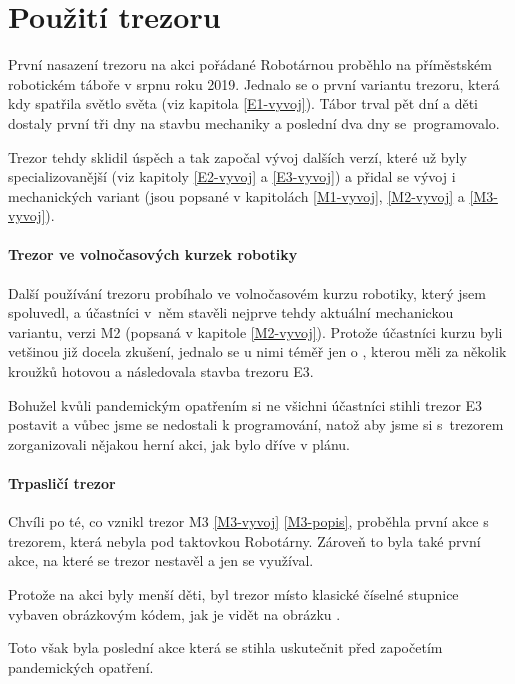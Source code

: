 \section{Použití trezoru}
První nasazení trezoru na akci pořádané Robotárnou \parencite{robotarna} proběhlo na příměstském robotickém táboře v srpnu roku 2019.
Jednalo se o první variantu trezoru, která kdy spatřila světlo světa (viz kapitola \ref{E1-vyvoj}). Tábor trval pět dní a děti dostaly první tři dny na stavbu mechaniky a poslední dva dny 
se~programovalo. 

Trezor tehdy sklidil úspěch a tak započal vývoj dalších verzí, které už byly specializovanější (viz kapitoly \ref{E2-vyvoj} a  \ref{E3-vyvoj}) a přidal se vývoj i mechanických
variant (jsou popsané v kapitolách \ref{M1-vyvoj}, \ref{M2-vyvoj} a \ref{M3-vyvoj}).

\paragraph{Trezor ve volnočasových kurzek robotiky}
Další používání trezoru pro\-bí\-ha\-lo ve volnočasovém kurzu robotiky, který jsem spoluvedl, a účastníci v~něm stavěli nejprve tehdy aktuální mechanickou variantu, verzi M2 (popsaná v kapitole \ref{M2-vyvoj}).
Protože účastníci kurzu byli vetšinou již docela zkušení, jednalo se u nimi téměř jen o , kterou měli za několik kroužků hotovou a následovala stavba trezoru E3. 

Bohužel kvůli pandemickým opatřením si ne všichni účastníci stihli trezor E3 postavit a vůbec jsme se nedostali k programování, natož aby jsme si s~trezorem zorganizovali nějakou herní akci, 
jak bylo dříve v plánu.

\paragraph{Trpasličí trezor}
Chvíli po té, co vznikl trezor M3 \ref{M3-vyvoj} \ref{M3-popis},  proběhla první akce s trezorem, která nebyla pod taktovkou Robotárny. Zároveň to byla také 
první akce, na které se trezor nestavěl a jen se využíval.

Protože na akci byly menší děti, byl trezor místo klasické číselné stupnice  vybaven obrázkovým kódem, jak je vidět na obrázku . %

Toto však byla poslední akce která se stihla uskutečnit před započetím pandemických opatření.

